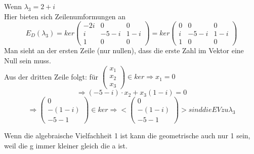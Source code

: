 \documentclass{article} %
\begin{document}
Wenn $\lambda_3 = 2+i$ \\
Hier bieten sich Zeilenumformungen an 
\[
E_D(\lambda_3) = ker\begin{pmatrix}
-2i&0&0\\
i&-5-i&1-i\\
1&0&0
\end{pmatrix} = ker\begin{pmatrix}
0&0&0\\
i&-5-i&1-i\\
1&0&0
\end{pmatrix}
\]
Man sieht an der ersten Zeile (nur nullen), dass die erste Zahl im Vektor eine Null sein muss. \\
Aus der dritten Zeile folgt: für $\begin{pmatrix} x_1 \\ x_2 \\ x_3 \end{pmatrix} \in ker \Rightarrow x_1 = 0$ \\
\[\Rightarrow (-5-i) \cdot x_2 + x_3 (1-i) = 0\]
\[\Rightarrow \begin{pmatrix} 0 \\ -(1-i) \\ -5-1 \end{pmatrix} \in ker \Rightarrow <\begin{pmatrix} 0 \\ -(1-i) \\ -5-1 \end{pmatrix} >  sind die EV zu \lambda_3 \]

Wenn die algebraische Vielfachheit 1 ist kann die geometrische auch nur 1 sein, weil die g immer kleiner gleich die a ist. 
\end{document}
